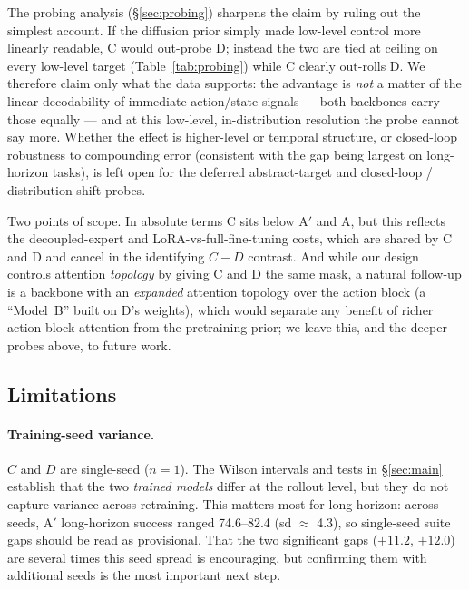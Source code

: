 \documentclass[conference]{IEEEtran}
\begin{document}
The probing analysis (\S\ref{sec:probing}) sharpens the claim by ruling out the
simplest account. If the diffusion prior simply made low-level control more
linearly readable, C would out-probe D; instead the two are tied at ceiling on
every low-level target (Table~\ref{tab:probing}) while C clearly out-rolls D. We
therefore claim only what the data supports: the advantage is \emph{not} a matter
of the linear decodability of immediate action/state signals --- both backbones
carry those equally --- and at this low-level, in-distribution resolution the probe
cannot say more. Whether the effect is higher-level or temporal structure, or
closed-loop robustness to compounding error (consistent with the gap being largest
on long-horizon tasks), is left open for the deferred abstract-target and
closed-loop / distribution-shift probes.

Two points of scope. In absolute terms C sits below A$'$ and A, but this reflects
the decoupled-expert and LoRA-vs-full-fine-tuning costs, which are shared by C and
D and cancel in the identifying $C-D$ contrast. And while our design controls
attention \emph{topology} by giving C and D the same mask, a natural follow-up is
a backbone with an \emph{expanded} attention topology over the action block (a
``Model~B'' built on D's weights), which would separate any benefit of richer
action-block attention from the pretraining prior; we leave this, and the deeper
probes above, to future work.

\subsection{Limitations}
\label{sec:limits}

\paragraph{Training-seed variance.} $C$ and $D$ are single-seed ($n{=}1$). The
Wilson intervals and tests in \S\ref{sec:main} establish that the two \emph{trained
models} differ at the rollout level, but they do not capture variance across
retraining. This matters most for long-horizon: across seeds, A$'$ long-horizon
success ranged 74.6--82.4 (sd $\approx$ 4.3), so single-seed suite gaps should be
read as provisional. That the two significant gaps ($+11.2$, $+12.0$) are several
times this seed spread is encouraging, but confirming them with additional seeds is
the most important next step.
\end{document}
